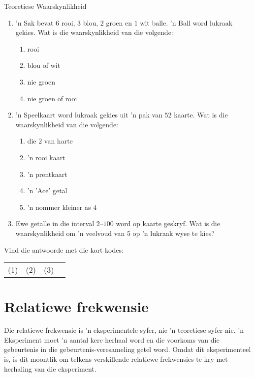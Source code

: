 \begin{exercises}{Teoretiese Waarskynlikheid}
  \begin{enumerate}[itemsep=5pt, label=\textbf{\arabic*}.]
  \item 'n Sak bevat $6$ rooi, $3$ blou, $2$ groen en $1$ wit
    balle. 'n Ball word lukraak gekies. Wat is die waarskynlikheid van die volgende:
    \begin{enumerate}
    \item rooi
    \item blou of wit
    \item nie groen
    \item nie groen of rooi
    \end{enumerate}
  \item 'n Speelkaart word lukraak gekies uit 'n pak van $52$ kaarte. Wat is die waarskynlikheid van die volgende:
    \begin{enumerate}

    \item die $2$ van harte
    \item 'n rooi kaart
    \item 'n prentkaart
    \item 'n 'Ace' getal
    \item 'n nommer kleiner as $4$
    \end{enumerate}

  \item Ewe getalle in die interval $2$--$100$ word op kaarte geskryf. Wat is
    die waarskynlikheid om 'n veelvoud van $5$ op 'n lukraak wyse te kies?
  \end{enumerate}

  Vind die antwoorde met die kort kodes: \\
  \begin{tabularx}{\textwidth}{XXXX}
    (1) & (2) & (3) \\
  \end{tabularx}
\end{exercises}

\section{Relatiewe frekwensie}


Die relatiewe frekwensie is 'n eksperimentele syfer, nie 'n teoretiese syfer nie. 'n Eksperiment moet 'n aantal kere herhaal word en die voorkoms van die gebeurtenis in die gebeurtenis-veresameling getel word. Omdat dit eksperimenteel is, is dit moontlik om telkens verskillende relatiewe frekwensies te kry met herhaling van die eksperiment.

